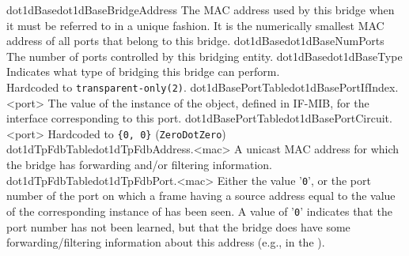

  {dot1dBase}{dot1dBaseBridgeAddress}{
	    The MAC address used by this bridge when it must be
	    referred to in a unique fashion.  It is the numerically smallest 
	    MAC address of all ports that belong to this bridge.}
  {dot1dBase}{dot1dBaseNumPorts}{
	    The number of ports controlled by this bridging
	    entity.}
  {dot1dBase}{dot1dBaseType}{
	    Indicates what type of bridging this bridge can
	    perform. \\Hardcoded to \texttt{transparent-only(2)}.}
  {dot1dBasePortTable}{dot1dBasePortIfIndex.<port>}{
	    The value of the instance of
	    the \texttt{} object,
	    defined in IF-MIB, for the interface corresponding
	    to this port.}
  {dot1dBasePortTable}{dot1dBasePortCircuit.<port>}{
	    Hardcoded to \texttt{\{0, 0\}} (\texttt{ZeroDotZero}) }
  {dot1dTpFdbTable}{dot1dTpFdbAddress.<mac>}{
	    A unicast MAC address for which the bridge has
	    forwarding and/or filtering information.}
  {dot1dTpFdbTable}{dot1dTpFdbPort.<mac>}{
	    Either the value '\texttt{0}', or the port number of the port on
	    which a frame having a source address equal to the value
	    of the corresponding instance of
	    \texttt{} has
	    been seen.  A value of '\texttt{0}' indicates that the port
	    number has not been learned, but that the bridge does
	    have some forwarding/filtering information about this
	    address (e.g., in
the \texttt{}).}
